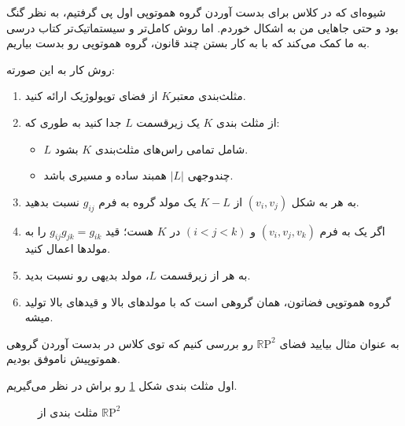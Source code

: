 \documentclass[a4paper, 12pt]{article}
\title{\textbf{
بدست آوردن سیستماتیک گروه هموتوپی اول فضاهای توپولوژیک
\author{حسین محمدی}
}}
\date{}
\begin{document}
\maketitle
شیوه‌ای که در کلاس برای بدست آوردن گروه هموتوپی اول پی گرفتیم، به نظر گنگ بود و حتی جاهایی من به اشکال خوردم. اما روش کامل‌تر و سیستماتیک‌تر کتاب درسی به ما کمک می‌کند که با به کار بستن چند قانون، گروه هموتوپی رو بدست بیاریم.

\noindent
روش کار به این صورته:
\begin{enumerate}
	\item مثلث‌بندی معتبر$K$  از فضای توپولوژیک ارائه کنید.
	\item از مثلث بندی $K$
	یک زیرقسمت
	$L$  جدا کنید به طوری که:
	\begin{itemize}
		\item $L$ شامل تمامی راس‌های مثلث‌بندی 
		$K$ بشود.
		
		\item چندوجهی 
		$|L|$
		   همبند ساده و مسیری باشد. 
	\end{itemize}
	\item به هر 
	به شکل 
	$(v_i,v_j)$
	از 
	$K-L$
	یک مولد گروه به فرم
	$g_{ij}$
	نسبت بدهید.
	\item اگر یک 
	به فرم 
	$(v_i,v_j,v_k)$
	و
	$(i<j<k)$
	در $K$ هست؛ قید 
	$g_{ij}g_{jk} = g_{ik}$
	را به مولدها اعمال کنید.
	\item به هر 
	 از زیرقسمت $L$، مولد بدیهی رو نسبت بدید.
	\item گروه هموتوپی فضاتون، همان گروهی است که با مولدهای بالا و قیدهای بالا تولید میشه.
\end{enumerate}

به عنوان مثال بیایید فضای 
$\mathbb{R}\text{P}^2$
 رو بررسی کنیم که توی کلاس در بدست آوردن گروهی هموتوپیش ناموفق بودیم.
 
 اول مثلث بندی شکل 
 \ref{rp2tri}
 رو براش در نظر می‌گیریم.
 \begin{figure}[h]
 	\caption{مثلث بندی از 
 	$\mathbb{R}\text{P}^2$
 	}
 	\label{rp2tri}
 \end{figure}
 
\end{document}
